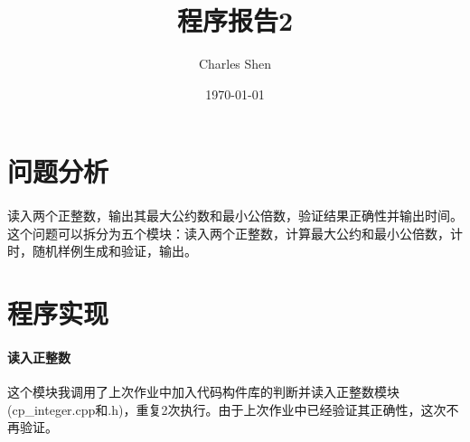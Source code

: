 \documentclass[UTF8]{ctexart}
\title{程序报告2}
\author{Charles Shen}
\date{\today}
\begin{document}
    \maketitle
    \section{问题分析}
    \paragraph{}
    读入两个正整数，输出其最大公约数和最小公倍数，验证结果正确性并输出时间。
    这个问题可以拆分为五个模块：读入两个正整数，计算最大公约和最小公倍数，计时，随机样例生成和验证，输出。
    \section{程序实现}
    \paragraph{读入正整数}
    这个模块我调用了上次作业中加入代码构件库的判断并读入正整数模块(cp\_integer.cpp和.h)，重复2次执行。由于上次作业中已经验证其正确性，这次不再验证。
\end{document}
